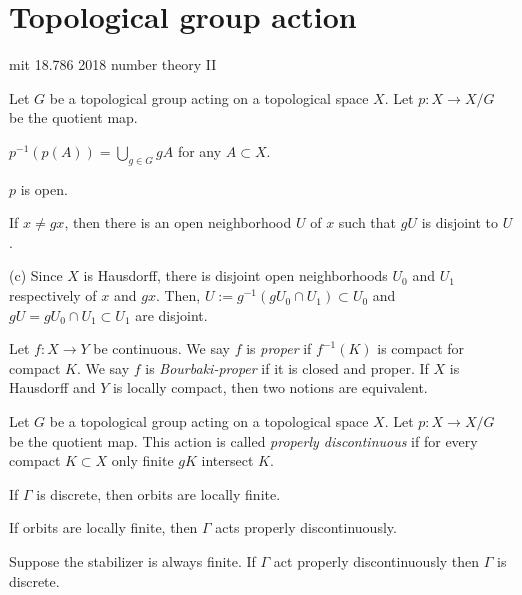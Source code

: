 \documentclass[a4paper]{article}
\begin{document}
\tableofcontents
\newpage
\section{Topological group action}

mit 18.786 2018 number theory II

\begin{prb}
Let $G$ be a topological group acting on a topological space $X$.
Let $p:X\to X/G$ be the quotient map.

\begin{parts}
\item $p^{-1}(p(A))=\bigcup_{g\in G}gA$ for any $A\subset X$.
\item $p$ is open.
\item If $x\ne gx$, then there is an open neighborhood $U$ of $x$ such that $gU$ is disjoint to $U$.
\end{parts}
\end{prb}
\begin{pf}
(c)
Since $X$ is Hausdorff, there is disjoint open neighborhoods $U_0$ and $U_1$ respectively of $x$ and $gx$.
Then, $U:=g^{-1}(gU_0\cap U_1)\subset U_0$ and $gU=gU_0\cap U_1\subset U_1$ are disjoint.
\end{pf}

\begin{prb}
Let $f:X\to Y$ be continuous.
We say $f$ is \emph{proper} if $f^{-1}(K)$ is compact for compact $K$.
We say $f$ is \emph{Bourbaki-proper} if it is closed and proper.
If $X$ is Hausdorff and $Y$ is locally compact, then two notions are equivalent.
\end{prb}



\begin{prb}
Let $G$ be a topological group acting on a topological space $X$.
Let $p:X\to X/G$ be the quotient map.
This action is called \emph{properly discontinuous} if for every compact $K\subset X$ only finite $gK$ intersect $K$.
\begin{parts}
\item If $\Gamma$ is discrete, then orbits are locally finite.
\item If orbits are locally finite, then $\Gamma$ acts properly discontinuously.
\item Suppose the stabilizer is always finite. If $\Gamma$ act properly discontinuously then $\Gamma$ is discrete.
\end{parts}
\end{prb}
\end{document}
